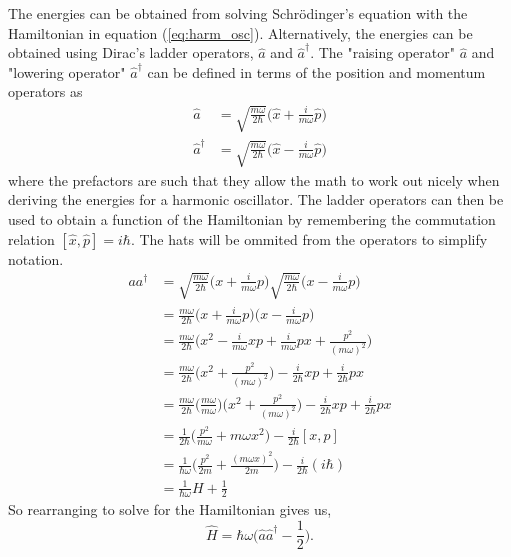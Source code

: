 \documentclass{article}
\newcommand{\be}{\begin{equation}}
\newcommand{\ee}{\end{equation}}
\begin{document}
The energies can be obtained from solving Schr\"odinger's equation with the Hamiltonian in equation (\ref{eq:harm_osc}).
Alternatively, the energies can be obtained using Dirac's ladder operators, $\hat{a}$ and $\hat{a}^{\dagger}$.\cite{griffiths,shankar}
The "raising operator" $\hat{a}$ and "lowering operator" $\hat{a}^{\dagger}$ can be defined in terms of the position and momentum operators as
\be
  \begin{split}
    \hat{a} &= \sqrt{\frac{m \omega}{2 \hbar}} \Big( \hat{x} + \frac{i}{m \omega} \hat{p}\Big) \\
    \hat{a}^{\dagger} &= \sqrt{\frac{m \omega}{2 \hbar}} \Big( \hat{x} - \frac{i}{m \omega} \hat{p}\Big)
  \end{split}
\ee
where the prefactors are such that they allow the math to work out nicely when deriving the energies for a harmonic oscillator.
The ladder operators can then be used to obtain a function of the Hamiltonian by remembering the commutation relation $[\hat{x},\hat{p}] = i \hbar$. The hats will be ommited from the operators to simplify notation.
\be
  \begin{split}
    aa^{\dagger} &= \sqrt{\frac{m \omega}{2 \hbar}} \Big( x + \frac{i}{m \omega} p\Big) \sqrt{\frac{m \omega}{2 \hbar}} \Big( x - \frac{i}{m \omega} p\Big) \\
    &= \frac{m \omega}{2 \hbar} \Big( x + \frac{i}{m \omega} p\Big) \Big( x - \frac{i}{m \omega} p\Big) \\
    &= \frac{m \omega}{2 \hbar} \Big( x^2 - \frac{i}{m \omega}xp + \frac{i}{m \omega}px + \frac{p^2}{(m \omega)^2} \Big) \\
    &= \frac{m \omega}{2 \hbar} \Big( x^2 + \frac{p^2}{(m \omega)^2} \Big) - \frac{i}{2 \hbar}xp + \frac{i}{2 \hbar}px \\
    &= \frac{m \omega}{2 \hbar} \Big( \frac{m \omega}{m \omega} \Big) \Big( x^2 + \frac{p^2}{(m \omega)^2} \Big) - \frac{i}{2 \hbar}xp + \frac{i}{2 \hbar}px \\
    &= \frac{1}{2 \hbar} \Big( \frac{p^2}{m \omega} + m \omega x^2\Big) - \frac{i}{2 \hbar} [x,p] \\
    &= \frac{1}{\hbar \omega} \Big( \frac{p^2}{2m} + \frac{(m \omega x)^2}{2m}\Big) - \frac{i}{2 \hbar} (i \hbar) \\
    &= \frac{1}{\hbar \omega} H + \frac{1}{2}
  \end{split}
\ee
So rearranging to solve for the Hamiltonian gives us,
\be \label{eq:h_plusminus}
  \hat{H} = \hbar \omega \Big( \hat{a} \hat{a}^{\dagger} - \frac{1}{2} \Big) .
\ee
\end{document}

